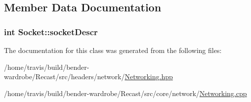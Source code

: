 \subsection{Member Data Documentation}
\hypertarget{class_socket_a610fbf456550dd084cfaee9d1267e5c8}{
\subsubsection[{socket\-Descr}]{\setlength{\rightskip}{0pt plus 5cm}int Socket\-::socket\-Descr\hspace{0.3cm}{\ttfamily [protected]}}}\label{class_socket_a610fbf456550dd084cfaee9d1267e5c8}


The documentation for this class was generated from the following files\-:\begin{DoxyCompactItemize}
\item 
/home/travis/build/bender-\/wardrobe/\-Recast/src/headers/network/\hyperlink{_networking_8hpp}{Networking.\-hpp}\item 
/home/travis/build/bender-\/wardrobe/\-Recast/src/core/network/\hyperlink{_networking_8cpp}{Networking.\-cpp}\end{DoxyCompactItemize}
